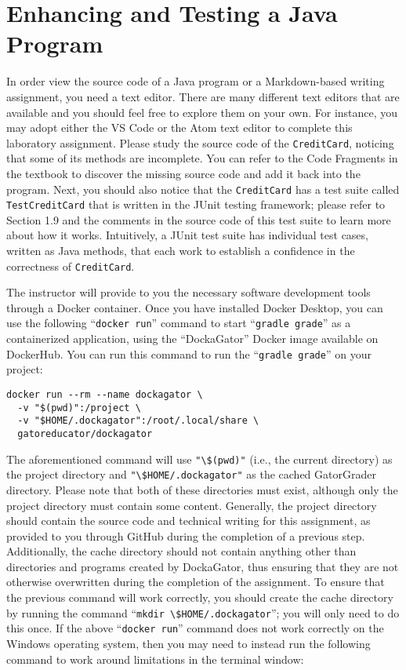 \documentclass[11pt]{article}
\newcommand{\mainprogram}{\lstinline{CreditCard}}
\newcommand{\testprogram}{\lstinline{TestCreditCard}}
\newcommand{\command}[1]{``\lstinline{#1}''}
\newcommand{\program}[1]{\lstinline{#1}}
\begin{document}
\section*{Enhancing and Testing a Java Program}

In order view the source code of a Java program or a Markdown-based writing
assignment, you need a text editor. There are many different text editors that
are available and you should feel free to explore them on your own. For
instance, you may adopt either the VS Code or the Atom text editor to complete
this laboratory assignment. Please study the source code of the \mainprogram,
noticing that some of its methods are incomplete. You can refer to the Code
Fragments in the textbook to discover the missing source code and add it back
into the program. Next, you should also notice that the \mainprogram{} has a
test suite called \testprogram{} that is written in the JUnit testing framework;
please refer to Section 1.9 and the comments in the source code of this test
suite to learn more about how it works. Intuitively, a JUnit test suite has
individual test cases, written as Java methods, that each work to establish a
confidence in the correctness of \mainprogram{}.


The instructor will provide to you the necessary software development tools
through a Docker container. Once you have installed Docker Desktop, you can use
the following \command{docker run} command to start \command{gradle grade} as a
containerized application, using the ``DockaGator'' Docker image available on
DockerHub. You can run this command to run the \command{gradle grade} on your
project:

\vspace*{-.1in}
\begin{verbatim}
docker run --rm --name dockagator \
  -v "$(pwd)":/project \
  -v "$HOME/.dockagator":/root/.local/share \
  gatoreducator/dockagator
\end{verbatim}
\vspace*{-.05in}

The aforementioned command will use \program{"\$(pwd)"} (i.e., the current
directory) as the project directory and \program{"\$HOME/.dockagator"} as the
cached GatorGrader directory. Please note that both of these directories must
exist, although only the project directory must contain some content. Generally,
the project directory should contain the source code and technical writing for
this assignment, as provided to you through GitHub during the completion of a
previous step. Additionally, the cache directory should not contain anything
other than directories and programs created by DockaGator, thus ensuring that
they are not otherwise overwritten during the completion of the assignment. To
ensure that the previous command will work correctly, you should create the
cache directory by running the command \command{mkdir \$HOME/.dockagator}; you
will only need to do this once. If the above \command{docker run} command does
not work correctly on the Windows operating system, then you may need to instead
run the following command to work around limitations in the terminal window:
\end{document}
